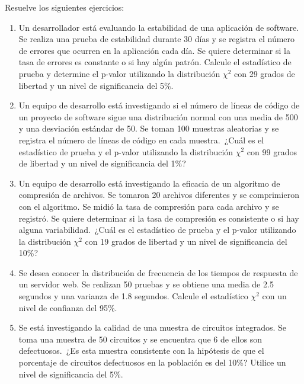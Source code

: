 \begin{Ejer}
Resuelve los siguientes ejercicios:
\begin{enumerate}

\item Un desarrollador est\'a evaluando la estabilidad de una aplicaci\'on de software. Se realiza una prueba de estabilidad durante 30 d\'ias y se registra el n\'umero de errores que ocurren en la aplicaci\'on cada d\'ia. Se quiere determinar si la tasa de errores es constante o si hay alg\'un patr\'on. Calcule el estad\'istico de prueba y determine el p-valor utilizando la distribuci\'on $\chi^2$ con 29 grados de libertad y un nivel de significancia del 5\%.

\item Un equipo de desarrollo est\'a investigando si el n\'umero de l\'ineas de c\'odigo de un proyecto de software sigue una distribuci\'on normal con una media de 500 y una desviaci\'on est\'andar de 50. Se toman 100 muestras aleatorias y se registra el n\'umero de l\'ineas de c\'odigo en cada muestra. \,¿Cu\'al es el estad\'istico de prueba y el p-valor utilizando la distribuci\'on $\chi^2$ con 99 grados de libertad y un nivel de significancia del 1\%?

\item Un equipo de desarrollo est\'a investigando la eficacia de un algoritmo de compresi\'on de archivos. Se tomaron 20 archivos diferentes y se comprimieron con el algoritmo. Se midi\'o la tasa de compresi\'on para cada archivo y se registr\'o. Se quiere determinar si la tasa de compresi\'on es consistente o si hay alguna variabilidad. \,¿Cu\'al es el estad\'istico de prueba y el p-valor utilizando la distribuci\'on $\chi^2$ con 19 grados de libertad y un nivel de significancia del 10\%?

\item Se desea conocer la distribuci\'on de frecuencia de los tiempos de respuesta de un servidor web. Se realizan 50 pruebas y se obtiene una media de 2.5 segundos y una varianza de 1.8 segundos. Calcule el estad\'istico $\chi^2$ con un nivel de confianza del 95\%.

\item Se est\'a investigando la calidad de una muestra de circuitos integrados. Se toma una muestra de 50 circuitos y se encuentra que 6 de ellos son defectuosos. \,¿Es esta muestra consistente con la hip\'otesis de que el porcentaje de circuitos defectuosos en la poblaci\'on es del 10\%? Utilice un nivel de significancia del 5\%.


\end{enumerate}
\end{Ejer}
